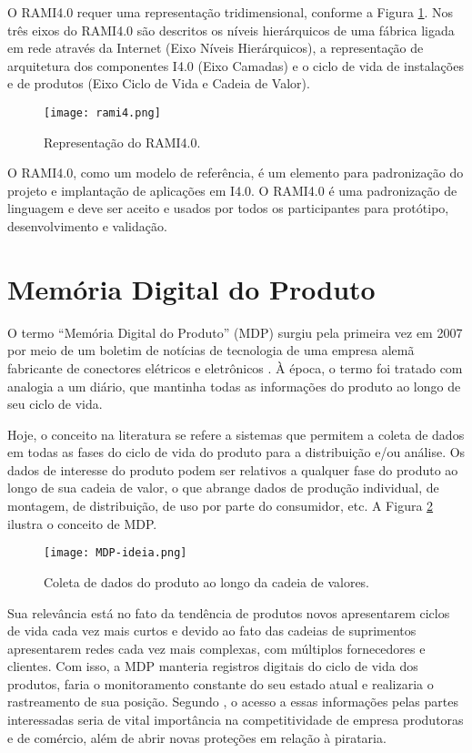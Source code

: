 	O RAMI4.0 requer uma representação tridimensional, conforme a Figura \ref{fig:rami4}. Nos três eixos do RAMI4.0 são descritos os níveis hierárquicos de uma fábrica ligada em rede através da Internet (Eixo Níveis Hierárquicos), a representação de arquitetura dos componentes I4.0 (Eixo Camadas) e o ciclo de vida de instalações e de produtos (Eixo Ciclo de Vida e Cadeia de Valor).
	
	\begin{figure}[hbt!]
		\centering
		\caption{Representação do RAMI4.0.}
		\texttt{[image: rami4.png]}
		\label{fig:rami4}
	\end{figure}

	O RAMI4.0, como um modelo de referência, é um elemento para padronização do projeto e implantação de aplicações em I4.0. O RAMI4.0 é uma padronização de linguagem e deve ser aceito e usados por todos os participantes para protótipo, desenvolvimento e validação.

\section{Memória Digital do Produto}

	O termo ``Memória Digital do Produto'' (MDP) surgiu pela primeira vez em 2007 por meio de um boletim de notícias de tecnologia de uma empresa alemã fabricante de conectores elétricos e eletrônicos \cite{wahlster2007digitalmemory}. À época, o termo foi tratado com analogia a um diário, que mantinha todas as informações do produto ao longo de seu ciclo de vida.

	Hoje, o conceito na literatura se refere a sistemas que permitem a coleta de dados em todas as fases do ciclo de vida do produto para a distribuição e/ou análise. Os dados de interesse do produto podem ser relativos a qualquer fase do produto ao longo de sua cadeia de valor, o que abrange dados de produção individual, de montagem, de distribuição, de uso por parte do consumidor, etc. A Figura \ref{fig:MDP-ideia} ilustra o conceito de MDP.
	 
	\begin{figure}[hbt!]
		\centering
		\caption{Coleta de dados do produto ao longo da cadeia de valores.}
		\texttt{[image: MDP-ideia.png]}
		\label{fig:MDP-ideia}
	\end{figure}

	Sua relevância está no fato da tendência de produtos novos apresentarem ciclos de vida cada vez mais curtos e devido ao fato das cadeias de suprimentos apresentarem redes cada vez mais complexas, com múltiplos fornecedores e clientes. Com isso, a MDP manteria registros digitais do ciclo de vida dos produtos, faria o monitoramento constante do seu estado atual e realizaria o rastreamento de sua posição. Segundo , o acesso a essas informações pelas partes interessadas seria de vital importância na competitividade de empresa produtoras e de comércio, além de abrir novas proteções em relação à pirataria.
	
